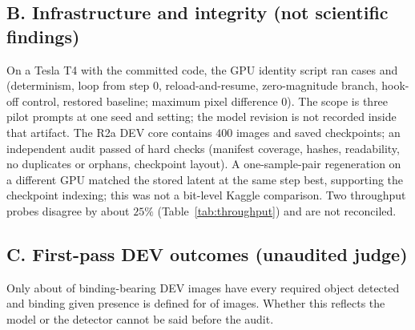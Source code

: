 \subsection{B. Infrastructure and integrity (not scientific findings)}
On a Tesla T4 with the committed code, the GPU identity script ran \rZeroCases{} cases and \rZeroHold{} (determinism, loop from step 0, reload-and-resume, zero-magnitude branch, hook-off control, restored baseline; maximum pixel difference $0$). The scope is three pilot prompts at one seed and setting; the model revision is not recorded inside that artifact. The R2a DEV core contains $400$ images and \rTwoLatents{} saved checkpoints; an independent audit passed \rTwoPassed{} of \rTwoChecks{} hard checks (manifest coverage, hashes, readability, no duplicates or orphans, checkpoint layout). A one-sample-pair regeneration on a different GPU matched the stored latent at the same step best, supporting the checkpoint indexing; this was not a bit-level Kaggle comparison. Two throughput probes disagree by about $25\%$ (Table~\ref{tab:throughput}) and are not reconciled.


\subsection{C. First-pass DEV outcomes (unaudited judge)}

Only about \rTwoPres{} of binding-bearing DEV images have every required object detected and binding given presence is defined for \rTwoEligN{} of \rTwoBB{} images. Whether this reflects the model or the detector cannot be said before the audit.
